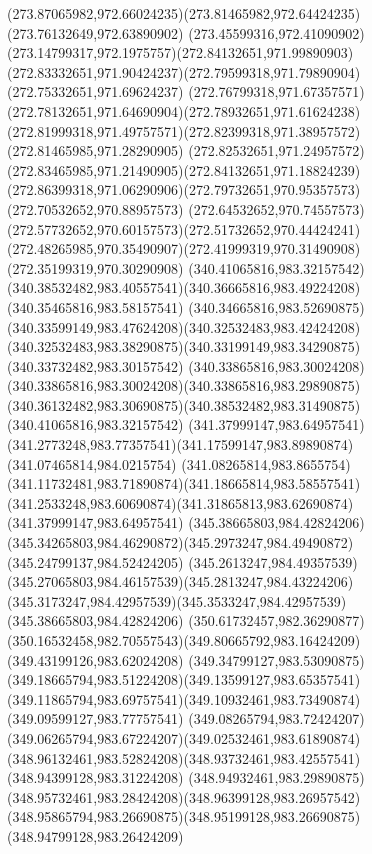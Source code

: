 {{		\curveto(273.87065982,972.66024235)(273.81465982,972.64424235)(273.76132649,972.63890902)
		\curveto(273.45599316,972.41090902)(273.14799317,972.1975757)(272.84132651,971.99890903)
		\curveto(272.83332651,971.90424237)(272.79599318,971.79890904)(272.75332651,971.69624237)
		\curveto(272.76799318,971.67357571)(272.78132651,971.64690904)(272.78932651,971.61624238)
		\curveto(272.81999318,971.49757571)(272.82399318,971.38957572)(272.81465985,971.28290905)
		\curveto(272.82532651,971.24957572)(272.83465985,971.21490905)(272.84132651,971.18824239)
		\curveto(272.86399318,971.06290906)(272.79732651,970.95357573)(272.70532652,970.88957573)
		\curveto(272.64532652,970.74557573)(272.57732652,970.60157573)(272.51732652,970.44424241)
		\curveto(272.48265985,970.35490907)(272.41999319,970.31490908)(272.35199319,970.30290908)
		\moveto(340.41065816,983.32157542)
		\curveto(340.38532482,983.40557541)(340.36665816,983.49224208)(340.35465816,983.58157541)
		\curveto(340.34665816,983.52690875)(340.33599149,983.47624208)(340.32532483,983.42424208)
		\curveto(340.32532483,983.38290875)(340.33199149,983.34290875)(340.33732482,983.30157542)
		\curveto(340.33865816,983.30024208)(340.33865816,983.30024208)(340.33865816,983.29890875)
		\curveto(340.36132482,983.30690875)(340.38532482,983.31490875)(340.41065816,983.32157542)
		\moveto(341.37999147,983.64957541)
		\curveto(341.2773248,983.77357541)(341.17599147,983.89890874)(341.07465814,984.0215754)
		\curveto(341.08265814,983.8655754)(341.11732481,983.71890874)(341.18665814,983.58557541)
		\curveto(341.2533248,983.60690874)(341.31865813,983.62690874)(341.37999147,983.64957541)
		\moveto(345.38665803,984.42824206)
		\curveto(345.34265803,984.46290872)(345.2973247,984.49490872)(345.24799137,984.52424205)
		\curveto(345.2613247,984.49357539)(345.27065803,984.46157539)(345.2813247,984.43224206)
		\curveto(345.3173247,984.42957539)(345.3533247,984.42957539)(345.38665803,984.42824206)
		\moveto(350.61732457,982.36290877)
		\curveto(350.16532458,982.70557543)(349.80665792,983.16424209)(349.43199126,983.62024208)
		\curveto(349.34799127,983.53090875)(349.18665794,983.51224208)(349.13599127,983.65357541)
		\curveto(349.11865794,983.69757541)(349.10932461,983.73490874)(349.09599127,983.77757541)
		\curveto(349.08265794,983.72424207)(349.06265794,983.67224207)(349.02532461,983.61890874)
		\curveto(348.96132461,983.52824208)(348.93732461,983.42557541)(348.94399128,983.31224208)
		\curveto(348.94932461,983.29890875)(348.95732461,983.28424208)(348.96399128,983.26957542)
		\curveto(348.95865794,983.26690875)(348.95199128,983.26690875)(348.94799128,983.26424209)
}}
